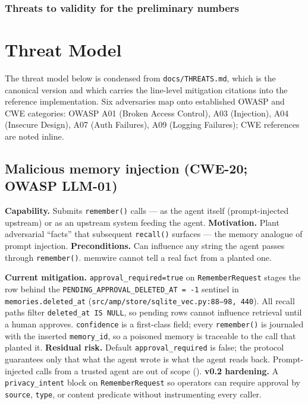 \documentclass[11pt,letterpaper,twocolumn]{article}
\begin{document}
\subsubsection*{Threats to validity for the preliminary numbers}

\section{Threat Model}
\label{sec:threats}

The threat model below is condensed from \texttt{docs/THREATS.md}, which is the canonical version and which carries the line-level mitigation citations into the reference implementation. Six adversaries map onto established OWASP and CWE categories: OWASP A01 (Broken Access Control), A03 (Injection), A04 (Insecure Design), A07 (Auth Failures), A09 (Logging Failures); CWE references are noted inline.

\subsection{Malicious memory injection (CWE-20; OWASP LLM-01)}
\label{sec:threats-injection}

\textbf{Capability.} Submits \texttt{remember()} calls --- as the agent itself (prompt-injected upstream) or as an upstream system feeding the agent. \textbf{Motivation.} Plant adversarial ``facts'' that subsequent \texttt{recall()} surfaces --- the memory analogue of prompt injection. \textbf{Preconditions.} Can influence any string the agent passes through \texttt{remember()}. memwire cannot tell a real fact from a planted one.

\textbf{Current mitigation.} \texttt{approval\_required=true} on \texttt{RememberRequest} stages the row behind the \texttt{PENDING\_APPROVAL\_DELETED\_AT = -1} sentinel in \texttt{memories.deleted\_at} (\texttt{src/amp/store/sqlite\_vec.py:88--98, 440}). All recall paths filter \texttt{deleted\_at IS NULL}, so pending rows cannot influence retrieval until a human approves. \texttt{confidence} is a first-class field; every \texttt{remember()} is journaled with the inserted \texttt{memory\_id}, so a poisoned memory is traceable to the call that planted it. \textbf{Residual risk.} Default \texttt{approval\_required} is false; the protocol guarantees only that what the agent wrote is what the agent reads back. Prompt-injected calls from a trusted agent are out of scope (). \textbf{v0.2 hardening.} A \texttt{privacy\_intent} block on \texttt{RememberRequest} so operators can require approval by \texttt{source}, \texttt{type}, or content predicate without instrumenting every caller.
\end{document}
